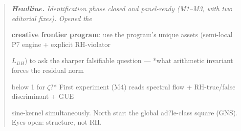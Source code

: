 \documentclass[10pt]{article}
\begin{document}
\begin{quote}\itshape
\textbf{Headline.} Identification phase closed and panel-ready (M1--M3, with two editorial fixes). Opened the\par
\textbf{creative frontier program}: use the program's unique assets (semi-local P7 engine + explicit RH-violator\par
$L_{DH}$) to ask the sharper falsifiable question --- *what arithmetic invariant forces the residual norm\par
below 1 for $\zeta$?* First experiment (M4) reads spectral flow + RH-true/false discriminant + GUE\par
sine-kernel simultaneously. North star: the global ad?le-class square (GNS). Eyes open: structure, not RH.\par
\end{quote}
\end{document}

